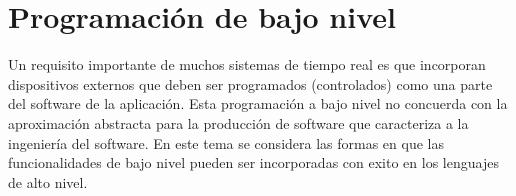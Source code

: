 \section{Programación de bajo nivel}

Un requisito importante de muchos sistemas de tiempo real es que incorporan
dispositivos externos que deben ser programados (controlados) como una parte del
software de la aplicación. Esta programación a bajo nivel no concuerda con la
aproximación abstracta para la producción de software que caracteriza a la
ingeniería del software. En este tema se considera las formas en que las
funcionalidades de bajo nivel pueden ser incorporadas con exito en los lenguajes
de alto nivel.
